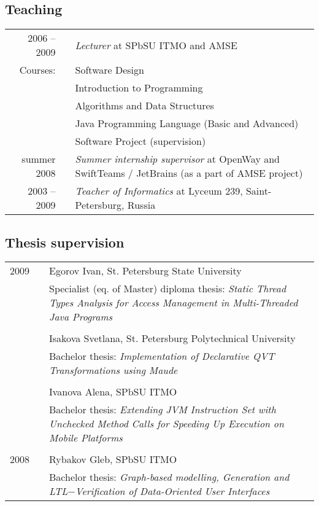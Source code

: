 \documentclass[a4paper, 12pt]{article}
\begin{document}
\subsection*{Teaching}
\begin{tabular}{ r l p{370pt} }
	2006 -- 2009 && {\it Lecturer} at SPbSU ITMO and AMSE\\%
	Courses: && Software Design\\
		 && Introduction to Programming\\
		 && Algorithms and Data Structures\\
		 && Java Programming Language (Basic and Advanced)\\
		 && Software Project (supervision)\\
	summer 2008 && {\it Summer internship supervisor} at OpenWay and SwiftTeams / JetBrains (as a part of AMSE project)\\%
	2003 -- 2009 && {\it Teacher of Informatics} at Lyceum 239, Saint-Petersburg, Russia\\%
\end{tabular}

\subsection*{Thesis supervision}
\begin{tabular}{ r l p{370pt} }
    2009 && Egorov Ivan, St. Petersburg State University\\
         && Specialist (eq. of Master) diploma thesis:
          \it Static Thread Types Analysis for Access Management in Multi-Threaded Java Programs\\
	 &&\\
         && Isakova Svetlana, St. Petersburg Polytechnical University\\
         && Bachelor thesis:
          \it Implementation of Declarative QVT Transformations using Maude\\
	 &&\\
         && Ivanova Alena, SPbSU ITMO\\
         && Bachelor thesis:
          \it Extending JVM Instruction Set with Unchecked Method Calls for Speeding Up Execution on Mobile Platforms\\
	 &&\\
2008     && Rybakov Gleb, SPbSU ITMO\\
         && Bachelor thesis:
          \it Graph-based modelling, Generation and LTL$-$Verification of Data-Oriented User Interfaces\\
\end{tabular}
\end{document}
